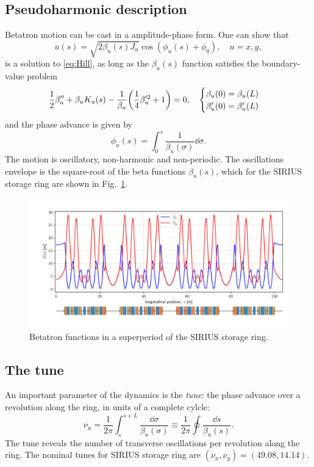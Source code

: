\subsection{Pseudoharmonic description}
Betatron motion can be cast in a amplitude-phase form. One can show that
\begin{equation}
    u(s) = \sqrt{2\beta_u(s) J_u}\cos(\phi_u(s) + \phi_0),\quad u=x,y,
    \label{eq:pseudo_harmon}
\end{equation}
is a solution to \eqref{eq:Hill}, as long as the $\beta_u(s)$ function satisfies the boundary-value problem
\begin{equation}
    \frac{1}{2}\beta_{u}^{\prime\prime}+\beta_{u} K_u(s) - \frac{1}{\beta_{u}}\qty(\frac{1}{4}\beta_{u}^{\prime 2} + 1 ) = 0, \quad
        \begin{cases}
            \beta_{u}(0) = \beta_{u}(L)\\ \beta_{u}^{\prime}(0) = \beta_{u}^{\prime}(L)
        \end{cases}
    \label{eq:beta_eq}
\end{equation}
and the phase advance is given by
    \begin{equation}
        \phi_u(s) = \int_{0}^{s}\frac{1}{\beta_u(\sigma)}\dd\sigma.
   \end{equation}
The motion is oscillatory, non-harmonic and non-periodic. The oscillations envelope is the square-root of the beta functions $\beta_u(s)$, which for the SIRIUS storage ring are shown in Fig.~\ref{betafunc}.
\begin{figure}[htb]
    \centering
    \includegraphics[width=\textwidth]{Images/beta_functions.pdf}
    \caption[Betatron functions in a superperiod of the SIRIUS storage ring]{Betatron functions in a superperiod of the SIRIUS storage ring.}
    \label{betafunc}
\end{figure}
\subsection{The tune}
An important parameter of the dynamics is the \textit{tune}: the phase advance over a revolution along the ring, in units of a complete cylcle:
\begin{equation*}
    \nu_u=\frac{1}{2\pi}\int_{s}^{s+L}\frac{\dd \sigma}{\beta_u(\sigma)}\equiv\frac{1}{2\pi}\oint\frac{\dd s}{\beta_u(s)}.
\end{equation*}
The tune reveals the number of transverse oscillations per revolution along the ring. The nominal tunes for SIRIUS storage ring are $(\nu_x, \nu_y)=(49.08, 14.14)$.

